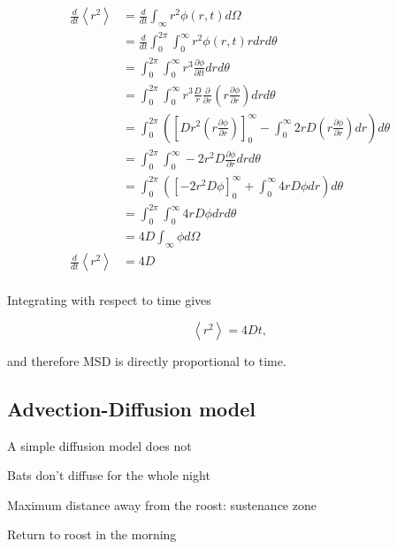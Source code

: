 \documentclass{article}
\newcommand{\D}[2]{\frac{\partial #1}{\partial #2}}
\begin{document}
\begin{equation}
\begin{split}
\frac{d}{dt} \left<r^2\right> &= \frac{d}{dt}\int_{\infty}r^2 \phi(r,t) d\Omega \\
                            &= \frac{d}{dt} \int_0^{2\pi}\int_0^{\infty} r^2 \phi(r,t) r dr d\theta \\
                           &= \int_0^{2\pi} \int_0^{\infty} r^3 \D{\phi}{l t} dr d\theta \\
                            &= \int_0^{2\pi} \int_0^{\infty} r^3 \frac{D}{r} \D{}{r } \left( r \D{ \phi}{ r}\right) dr d\theta \\
                            &= \int_0^{2\pi} \left( \left[ D r^2 \left( r \D{ \phi}{ r}\right) \right]_0^{\infty} - \int_0^{\infty} 2rD \left(r \frac{\partial \phi}{\partial r} \right) dr \right) d\theta \\
                            &= \int_0^{2\pi} \int_0^{\infty} -2r^2D \D{ \phi}{r}dr d\theta \\
                            &= \int_0^{2\pi} \left( \left[-2r^2D \phi \right]_0^{\infty} + \int_0^{\infty} 4rD \phi dr \right)d\theta \\
                            &= \int_0^{2\pi} \int_0^{\infty} 4rD\phi dr d\theta \\
                            &= 4D \int_{\infty} \phi d\Omega \\
\frac{d}{dt} \left<r^2\right>  &= 4D \\
\label{eqn:diffusion_1}
\end{split}
\end{equation}

Integrating with respect to time gives

\begin{equation}
\left<r^2\right> = 4Dt ,
\label{eqn:diffusion_msd}
\end{equation}

and therefore MSD is directly proportional to time.


\subsection{Advection-Diffusion model}

A simple diffusion model does not

Bats don't diffuse for the whole night

Maximum distance away from the roost: sustenance zone

Return to roost in the morning
\end{document}
